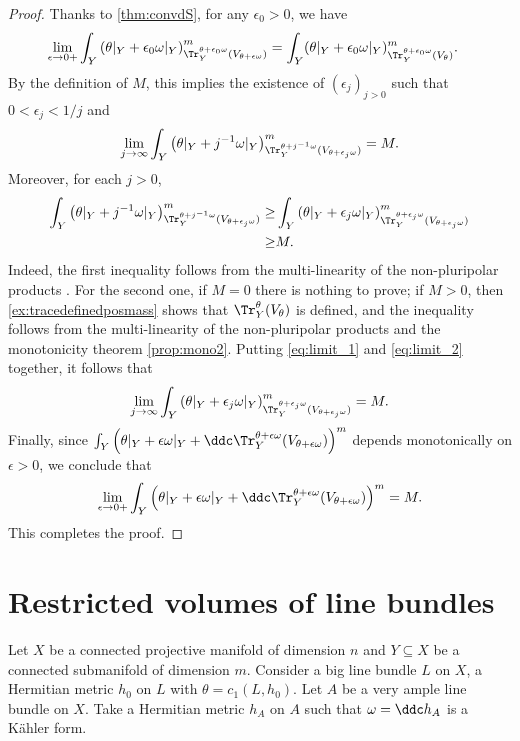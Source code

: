 \begin{proof}
Thanks to \cref{thm:convdS}, for any $\epsilon_0>0$, we have
\[
\begin{aligned}
\lim_{\epsilon\to 0+}\int_Y \left(\theta|_Y + \epsilon_0 \omega|_Y\right)^m_{\Tr_Y^{\theta + \epsilon_0 \omega}(V_{\theta + \epsilon \omega})}
&= \int_Y (\theta|_Y + \epsilon_0 \omega|_Y)^m_{\Tr_Y^{\theta + \epsilon_0 \omega}(V_{\theta})}.
\end{aligned}
\]
By the definition of $M$, this implies the existence of $(\epsilon_j)_{j>0}$ such that $0<\epsilon_j<1/j$ and
\begin{equation}\label{eq:limit_1}
\lim_{j\to\infty}\int_Y \left(\theta|_Y + j^{-1}\omega|_Y\right)^m_{\Tr_Y^{\theta + j^{-1} \omega}(V_{\theta + \epsilon_j \omega}) } = M.
\end{equation}
Moreover, for each $j>0$,
\begin{equation}\label{eq:limit_2}
\begin{aligned}
\int_Y \left(\theta|_Y + j^{-1} \omega|_Y\right)^m_{\Tr_Y^{\theta + j^{-1} \omega}(V_{\theta + \epsilon_j \omega}) } \geq & \int_Y \left(\theta|_Y + \epsilon_j \omega|_Y\right)^m_{\Tr_Y^{\theta + \epsilon_j\omega}(V_{\theta + \epsilon_j \omega}) } \\
\geq & M.
\end{aligned}
\end{equation}
Indeed, the first inequality follows from the multi-linearity of the non-pluripolar products . For the second one, if $M=0$ there is nothing to prove; if $M>0$, then \cref{ex:tracedefinedposmass} shows that $\Tr_Y^\theta(V_\theta)$ is defined, and the inequality follows from the multi-linearity of the non-pluripolar products  and the monotonicity theorem \cref{prop:mono2}.
Putting \eqref{eq:limit_1} and \eqref{eq:limit_2} together, it follows that
\[
\lim_{j\to\infty}\int_Y \left(\theta|_Y + \epsilon_j \omega|_Y\right)^m_{\Tr_Y^{\theta + \epsilon_j \omega}(V_{\theta + \epsilon_j \omega}) } = M.
\]
Finally, since $\int_Y \left(\theta|_Y + \epsilon \omega|_Y +  \ddc \Tr_Y^{\theta+ \epsilon \omega}(V_{\theta+ \epsilon \omega}) \right)^m$ depends monotonically on $\epsilon>0$, we conclude that
\[
\lim_{\epsilon\to 0+}\int_Y \left(\theta|_Y + \epsilon \omega|_Y +  \ddc \Tr_Y^{\theta+ \epsilon \omega}(V_{\theta+ \epsilon \omega}) \right)^m=M.
\]
This completes the proof.
\end{proof}



\section{Restricted volumes of line bundles}\label{sec:resvol}
Let $X$ be a connected projective manifold of dimension $n$ and $Y\subseteq X$ be a connected submanifold of dimension $m$. Consider a big line bundle $L$ on $X$, a Hermitian metric $h_0$ on $L$ with $\theta=c_1(L,h_0)$.
Let $A$ be a very ample line bundle on $X$. Take a Hermitian metric $h_A$ on $A$ such that $\omega=\ddc h_A$ is a Kähler form.


